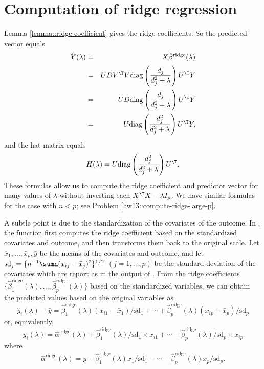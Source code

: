 \section{Computation of ridge regression}\label{sec::computation-ridge}
 
 
Lemma \ref{lemma::ridge-coefficient} gives the ridge coefficients. So
 the predicted vector equals
\begin{eqnarray*}
 \hat{Y}(\lambda) &=& X  \hat{\beta}^{\text{ridge}}(\lambda) \\
&=& UDV^{\T} V\text{diag}\left(  \frac{d_j}{d_j^2 + \lambda }  \right)  U^{\T} Y \\
&=& UD \text{diag}\left(  \frac{d_j}{d_j^2 + \lambda }  \right)  U^{\T} Y \\
&=& U \text{diag}\left(  \frac{d_j^2}{d_j^2 + \lambda }  \right)  U^{\T} Y,
\end{eqnarray*}
and the hat matrix equals
\begin{eqnarray*}
H  (\lambda)  = U \text{diag}\left(  \frac{d_j^2}{d_j^2 + \lambda }  \right)   U^{\T}.
\end{eqnarray*}
These formulas allow us to compute the ridge coefficient and predictor vector for many values of $\lambda$ without inverting each $X^{\T} X + \lambda I_p$. 
We have similar formulas for the case with $n<p$; see Problem \ref{hw13::compute-ridge-large-p}.  


A subtle point is due to the standardization of the covariates of the outcome. In , the  function first computes the ridge coefficient based on the standardized covariates and outcome, and then transforms them back to the original scale. Let $\bar{x}_1,\ldots, \bar{x}_p, \bar{y}$ be the means of the covariates and outcome, and let $\text{sd}_j = \{ n^{-1} \sumn (x_{ij} - \bar{x}_j) ^2 \}^{1/2}$ $(j=1, \ldots, p)$ be the standard deviation of the covariates which are report as  in the output of . From the ridge coefficients $\{ \hat{\beta}_1^\text{ridge}(\lambda) ,\ldots,  \hat{\beta}_p^\text{ridge}(\lambda) \}$ based on the standardized variables, we can obtain the predicted values based on the original variables as
$$
\hat{y}_i(\lambda ) - \bar{y} =  \hat{\beta}_1^\text{ridge}(\lambda)  (x_{i1} - \bar{x}_1)/\text{sd}_1 + \cdots +  \hat{\beta}_p^\text{ridge}(\lambda)  (x_{ip} - \bar{x}_p)/\text{sd}_p
$$
or, equivalently,
$$
\hat{y}_i(\lambda )  = \hat\alpha^\text{ridge}(\lambda) 
+  \hat{\beta}_1^\text{ridge}(\lambda) /  \text{sd}_1 \times  x_{i1} + \cdots +  \hat{\beta}_p^\text{ridge}(\lambda)  / \text{sd}_p \times x_{ip}   
$$
where 
$$
\hat\alpha^\text{ridge}(\lambda)  = 
\bar{y} - \hat{\beta}_1^\text{ridge}(\lambda) \bar{x}_1/ \text{sd}_1 -  \cdots - \hat{\beta}_p^\text{ridge}(\lambda) \bar{x}_p/ \text{sd}_p . 
$$



